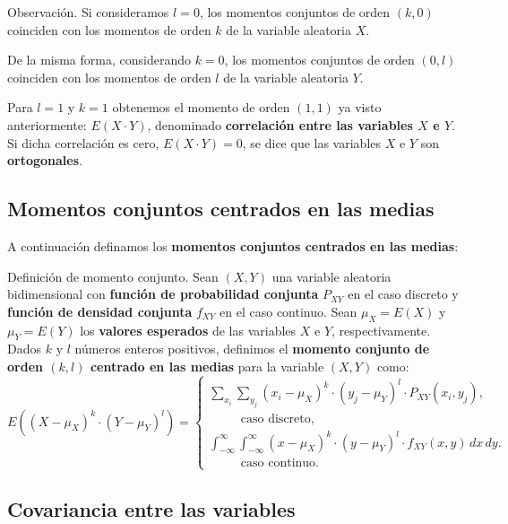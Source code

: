 \documentclass[
  letterpaper,
  DIV=11,
  numbers=noendperiod]{scrreprt}
\begin{document}
Observación. Si consideramos \(l=0\), los momentos conjuntos de orden
\((k,0)\) coinciden con los momentos de orden \(k\) de la variable
aleatoria \(X\).

De la misma forma, considerando \(k=0\), los momentos conjuntos de orden
\((0,l)\) coinciden con los momentos de orden \(l\) de la variable
aleatoria \(Y\).

Para \(l=1\) y \(k=1\) obtenemos el momento de orden \((1,1)\) ya visto
anteriormente: \(E(X\cdot Y)\), denominado \textbf{correlación entre las
variables \(X\) e \(Y\)}. Si dicha correlación es cero,
\(E(X\cdot Y)=0\), se dice que las variables \(X\) e \(Y\) son
\textbf{ortogonales}.

\hypertarget{momentos-conjuntos-centrados-en-las-medias}{%
\subsection{Momentos conjuntos centrados en las
medias}\label{momentos-conjuntos-centrados-en-las-medias}}

A continuación definamos los \textbf{momentos conjuntos centrados en las
medias}:

Definición de momento conjunto. Sean \((X,Y)\) una variable aleatoria
bidimensional con \textbf{función de probabilidad conjunta} \(P_{XY}\)
en el caso discreto y \textbf{función de densidad conjunta} \(f_{XY}\)
en el caso continuo. Sean \(\mu_X=E(X)\) y \(\mu_Y=E(Y)\) los
\textbf{valores esperados} de las variables \(X\) e \(Y\),
respectivamente. Dados \(k\) y \(l\) números enteros positivos,
definimos el \textbf{momento conjunto de orden \((k,l)\) centrado en las
medias} para la variable \((X,Y)\) como: \[
E\left((X-\mu_X)^k\cdot  (Y-\mu_Y)^l\right)=\begin{cases}
\sum_{x_i}\sum_{y_j} (x_i-\mu_X)^k \cdot (y_j-\mu_Y)^l\cdot  P_{XY}(x_i,y_j), & \\\ \qquad \mbox{ caso discreto,}& \\
\int_{-\infty}^\infty\int_{-\infty}^\infty (x-\mu_X)^k\cdot  (y-\mu_Y)^l\cdot  f_{XY}(x,y)\, dx\, dy. & \\ \ \qquad\mbox{ caso continuo.} &
\end{cases}
\]

\hypertarget{covariancia-entre-las-variables}{%
\subsection{Covariancia entre las
variables}\label{covariancia-entre-las-variables}}
\end{document}
